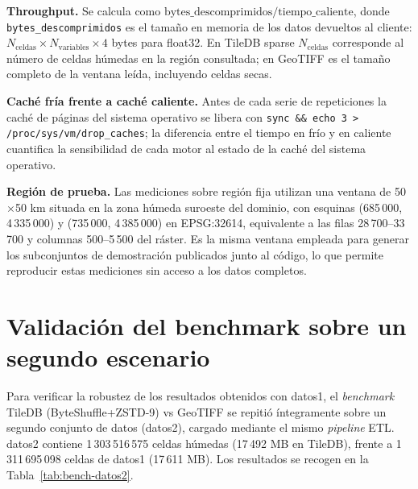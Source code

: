 \textbf{Throughput.} Se calcula como $\text{bytes\_descomprimidos} / \text{tiempo\_caliente}$, donde \texttt{bytes\_descomprimidos} es el tamaño en memoria de los datos devueltos al cliente: $N_{\text{celdas}} \times N_{\text{variables}} \times 4$ bytes para float32. En TileDB sparse $N_{\text{celdas}}$ corresponde al número de celdas húmedas en la región consultada; en GeoTIFF es el tamaño completo de la ventana leída, incluyendo celdas secas.

\textbf{Caché fría frente a caché caliente.} Antes de cada serie de repeticiones la caché de páginas del sistema operativo se libera con \texttt{sync \&\& echo 3 > /proc/sys/vm/drop\_caches}; la diferencia entre el tiempo en frío y en caliente cuantifica la sensibilidad de cada motor al estado de la caché del sistema operativo.

\textbf{Región de prueba.} Las mediciones sobre región fija utilizan una ventana de 50$\times$50 km situada en la zona húmeda suroeste del dominio, con esquinas (685\,000, 4\,335\,000) y (735\,000, 4\,385\,000) en EPSG:32614, equivalente a las filas 28\,700--33\,700 y columnas 500--5\,500 del ráster. Es la misma ventana empleada para generar los subconjuntos de demostración publicados junto al código, lo que permite reproducir estas mediciones sin acceso a los datos completos.

\section{Validación del benchmark sobre un segundo escenario}\label{validacion-benchmark-datos2}

Para verificar la robustez de los resultados obtenidos con datos1, el \textit{benchmark} TileDB (ByteShuffle+ZSTD-9) vs GeoTIFF se repitió íntegramente sobre un segundo conjunto de datos (datos2), cargado mediante el mismo \textit{pipeline} ETL. datos2 contiene 1\,303\,516\,575 celdas húmedas (17\,492 MB en TileDB), frente a 1\,311\,695\,098 celdas de datos1 (17\,611 MB). Los resultados se recogen en la Tabla~\ref{tab:bench-datos2}.

